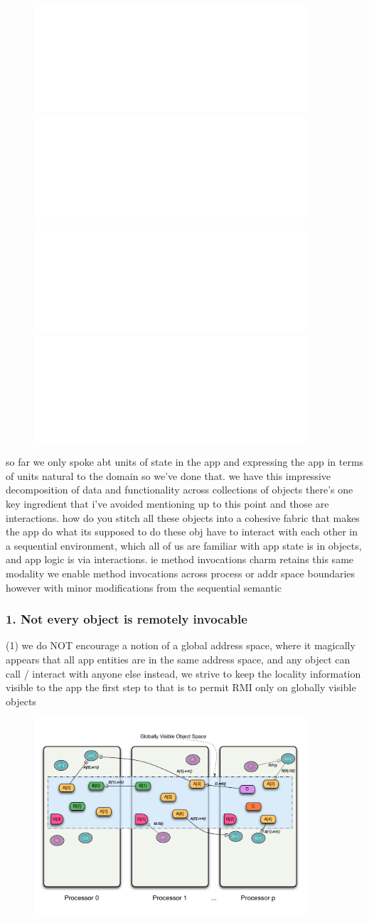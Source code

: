 \begin{frame}
  \frametitle{}
  \begin{figure}
	\includegraphics<1>[width=0.9\textwidth]{../figures/progmodel/07-obj-programmer-view.pdf}
	\includegraphics<2>[width=0.9\textwidth]{../figures/progmodel/05-parallelism-via-obj-collections.pdf}
	\includegraphics<3>[width=0.9\textwidth]{../figures/progmodel/08-seq-obj-methods.pdf}
	\includegraphics<4>[width=0.9\textwidth]{../figures/progmodel/09-rmi-synchronous.pdf}
  \end{figure}
so far we only spoke abt units of state in the app
and expressing the app in terms of units natural to the domain
so we've done that.
we have this impressive decomposition of data and functionality across collections of objects
there's one key ingredient that i've avoided mentioning up to this point
and those are interactions.
how do you stitch all these objects into a cohesive fabric that makes the app do what its supposed
to do
these obj have to interact with each other
% 
in a sequential environment, which all of us are familiar with
app state is in objects, and app logic is via interactions. ie method invocations
%
charm retains this same modality
we enable method invocations across process or addr space boundaries
%
however with minor modifications from the sequential semantic
\end{frame}


\begin{frame}
\frametitle{1. Not every object is remotely invocable}
(1) we do NOT encourage a notion of a global address space, where it magically appears that
all app entities are in the same address space, and any object can call / interact with anyone else
instead, we strive to keep the locality information visible to the app
the first step to that is to permit RMI only on globally visible objects
  \begin{figure}\includegraphics[width=0.9\textwidth]{../figures/progmodel/10-rmi-notgas.pdf}\end{figure}
\end{frame}


